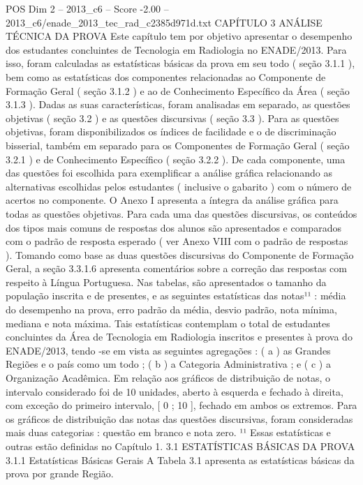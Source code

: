 \begin{textsample}{POS Dim 2 – 2013\_c6 – Score -2.00 – 2013\_c6/enade\_2013\_tec\_rad\_c2385d971d.txt}  \label{ex:f2_pos_382}
CAPÍTULO 3 ANÁLISE TÉCNICA DA PROVA Este capítulo tem por objetivo apresentar o desempenho dos estudantes concluintes de Tecnologia em Radiologia no ENADE/2013.
Para isso, foram calculadas as estatísticas básicas da prova em seu todo ( seção 3.1.1 ), bem como as estatísticas dos componentes relacionadas ao Componente de Formação Geral ( seção 3.1.2 ) e ao de Conhecimento Específico da Área ( seção 3.1.3 ).
Dadas as suas características, foram analisadas em separado, as questões objetivas ( seção 3.2 ) e as questões discursivas ( seção 3.3 ).
Para as questões objetivas, foram disponibilizados os índices de facilidade e o de discriminação bisserial, também em separado para os Componentes de Formação Geral ( seção 3.2.1 ) e de Conhecimento Específico ( seção 3.2.2 ).
De cada componente, uma das questões foi escolhida para exemplificar a análise gráfica relacionando as alternativas escolhidas pelos estudantes ( inclusive o gabarito ) com o número de acertos no componente.
O Anexo I apresenta a íntegra da análise gráfica para todas as questões objetivas.
Para cada uma das questões discursivas, os conteúdos dos tipos mais comuns de respostas dos alunos são apresentados e comparados com o padrão de resposta esperado ( ver Anexo VIII com o padrão de respostas ).
Tomando como base as duas questões discursivas do Componente de Formação Geral, a seção 3.3.1.6 apresenta comentários sobre a correção das respostas com respeito à Língua Portuguesa.
Nas tabelas, são apresentados o tamanho da população inscrita e de presentes, e as seguintes estatísticas das notas¹¹ : média do desempenho na prova, erro padrão da média, desvio padrão, nota mínima, mediana e nota máxima.
Tais estatísticas contemplam o total de estudantes concluintes da Área de Tecnologia em Radiologia inscritos e presentes à prova do ENADE/2013, tendo -se em vista as seguintes agregações : ( a ) as Grandes Regiões e o país como um todo ; ( b ) a Categoria Administrativa ; e ( c ) a Organização Acadêmica.
Em relação aos gráficos de distribuição de notas, o intervalo considerado foi de 10 unidades, aberto à esquerda e fechado à direita, com exceção do primeiro intervalo, [ 0 ; 10 ], fechado em ambos os extremos.
Para os gráficos de distribuição das notas das questões discursivas, foram consideradas mais duas categorias : questão em branco e nota zero. ¹¹ Essas estatísticas e outras estão definidas no Capítulo 1. 3.1 ESTATÍSTICAS BÁSICAS DA PROVA 3.1.1 Estatísticas Básicas Gerais A Tabela 3.1 apresenta as estatísticas básicas da prova por grande Região.

\end{textsample}
